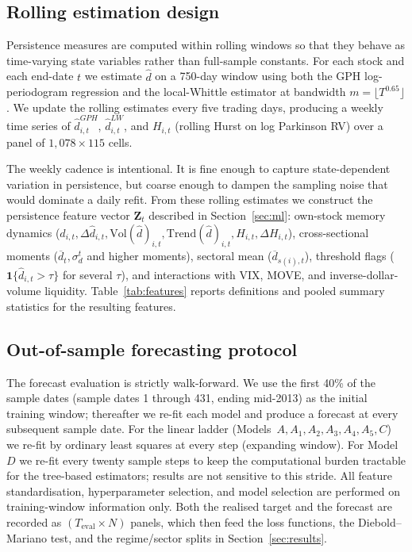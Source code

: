 \documentclass[11pt,a4paper]{article}
\newcommand{\dhat}{\hat d}
\begin{document}


\subsection{Rolling estimation design}

Persistence measures are computed within rolling windows so that they
behave as time-varying state variables rather than full-sample
constants. For each stock and each end-date $t$ we estimate $\dhat$
on a 750-day window using both the GPH log-periodogram regression and
the local-Whittle estimator at bandwidth $m=\lfloor T^{0.65}\rfloor$.
We update the rolling estimates every five trading days, producing a
weekly time series of $\dhat_{i,t}^{GPH}$, $\dhat_{i,t}^{LW}$, and
$H_{i,t}$ (rolling Hurst on log Parkinson RV) over a panel of
$1{,}078\times 115$ cells.

The weekly cadence is intentional. It is fine enough to capture
state-dependent variation in persistence, but coarse enough to dampen
the sampling noise that would dominate a daily refit. From these rolling
estimates we construct the persistence feature vector $\mathbf Z_t$
described in Section~\ref{sec:ml}: own-stock memory dynamics
($\dhat_{i,t},\Delta\dhat_{i,t},\mathrm{Vol}(\dhat)_{i,t},
\mathrm{Trend}(\dhat)_{i,t},H_{i,t},\Delta H_{i,t}$), cross-sectional
moments ($\overline d_t,\sigma_d^t$ and higher moments), sectoral mean
($\overline d_{s(i),t}$), threshold flags
($\mathbf 1\{\dhat_{i,t}>\tau\}$ for several $\tau$), and interactions
with VIX, MOVE, and inverse-dollar-volume liquidity.
Table~\ref{tab:features} reports definitions and pooled summary
statistics for the resulting features.



\subsection{Out-of-sample forecasting protocol}

The forecast evaluation is strictly walk-forward. We use the first 40\%
of the sample dates (sample dates 1 through 431, ending mid-2013) as the
initial training window; thereafter we re-fit each model and produce a
forecast at every subsequent sample date. For the linear ladder
(Models~$A,A_1,A_2,A_3,A_4,A_5,C$) we re-fit by ordinary least squares
at every step (expanding window). For Model~$D$ we
re-fit every twenty sample steps to keep the computational burden
tractable for the tree-based estimators; results are not sensitive to
this stride. All feature standardisation, hyperparameter selection, and
model selection are performed on training-window information only.
Both the realised target and the forecast are recorded as
$(T_{\mathrm{eval}}\!\times\!N)$ panels, which then feed the loss
functions, the Diebold--Mariano test, and the regime/sector splits in
Section~\ref{sec:results}.
\end{document}
